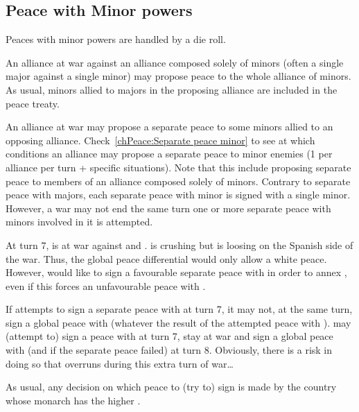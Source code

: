 \subsection{Peace with Minor powers}\label{chPeace:Peace with Minors}
\aparag Peaces with minor powers are handled by a die roll.

 An alliance at war against an alliance composed solely
of minors (often a single major against a single minor) may propose peace to
the whole alliance of minors.
\bparag As usual, minors allied to majors in the proposing alliance are
included in the peace treaty.

 An alliance at war may propose a separate peace to
some minors allied to an opposing alliance.
\bparag Check~\ref{chPeace:Separate peace minor} to see at which conditions an
alliance may propose a separate peace to minor enemies (1 per alliance per
turn + specific situations).
\bparag Note that this include proposing separate peace to members of an
alliance composed solely of minors.
\bparag Contrary to separate peace with majors, each separate peace with minor
is signed with a single minor. However, a war may not end the same turn one or
more separate peace with minors involved in it is attempted.

\begin{exemple}
  At turn 7, \FRA is at war against \HIS and \paysSavoie. \FRA is crushing
  \paysSavoie but is loosing on the Spanish side of the war. Thus, the global
  peace differential would only allow a white peace. However, \FRA would like
  to sign a favourable separate peace with \paysSavoie in order to annex
  \provinceBresse, even if this forces an unfavourable peace with \HIS.

  If \FRA attempts to sign a separate peace with \paysSavoie at turn 7, it may
  not, at the same turn, sign a global peace with \HIS (whatever the result of
  the attempted peace with \paysSavoie). \FRA may (attempt to) sign a peace
  with \paysSavoie at turn 7, stay at war and sign a global peace with \HIS
  (and \paysSavoie if the separate peace failed) at turn 8. Obviously, there
  is a risk in doing so that \HIS overruns \FRA during this extra turn of
  war\ldots
\end{exemple}

\aparag[Disagreement] As usual, any decision on which peace to (try to) sign
is made by the country whose monarch has the higher \DIP.

